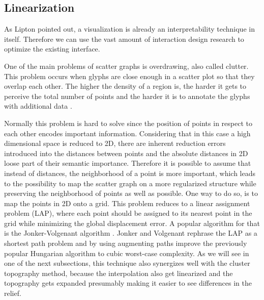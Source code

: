 \subsection{Linearization}

As Lipton \cite{liptonMythosModelInterpretability2016a} pointed out, a visualization is already an interpretability technique in itself. Therefore we can use the vast amount of interaction design research to optimize the existing interface. 

One of the main problems of scatter graphs is overdrawing, also called clutter. This problem occurs when glyphs are close enough in a scatter plot so that they overlap each other. The higher the density of a region is, the harder it gets to perceive the total number of points and the harder it is to annotate the glyphs with additional data \cite{mayorgaSplatterplotsOvercomingOverdraw2013}. 

Normally this problem is hard to solve since the position of points in respect to each other encodes important information. Considering that in this case a high dimensional space is reduced to 2D, there are inherent reduction errors introduced into the distances between points and the absolute distances in 2D loose part of their semantic importance. Therefore it is possible to assume that instead of distances, the neighborhood of a point is more important, which leads to the possibility to map the scatter graph on a more regularized structure while preserving the neighborhood of points as well as possible. One way to do so, is to map the points in 2D onto a grid. This problem reduces to a linear assignment problem (LAP), where each point should be assigned to its nearest point in the grid while minimizing the global displacement error. A popular algorithm for that is the Jonker-Volgenant algorithm \cite{jonkerShortestAugmentingPath1987}. Jonker and Volgenant rephrase the LAP as a shortest path problem and by using augmenting paths improve the previously popular Hungarian algorithm to cubic worst-case complexity. As we will see in one of the next subsections, this technique also synergizes well with the cluster topography method, because the interpolation also get linearized and the topography gets expanded presumably making it easier to see differences in the relief.

